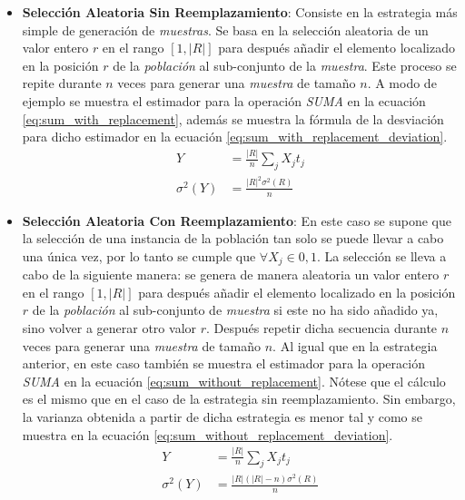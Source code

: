 \documentclass{subfiles}
\begin{document}
        \begin{itemize}

          \item \textbf{Selección Aleatoria Sin Reemplazamiento}: Consiste en la estrategia más simple de generación de \emph{muestras}. Se basa en la selección aleatoria de un valor entero $r$ en el rango $[1, |R|]$ para después añadir el elemento localizado en la posición $r$ de la \emph{población} al sub-conjunto de la \emph{muestra}. Este proceso se repite durante $n$ veces para generar una \emph{muestra} de tamaño $n$. A modo de ejemplo se muestra el estimador para la operación \emph{SUMA} en la ecuación \eqref{eq:sum_with_replacement}, además se muestra la fórmula de la desviación para dicho estimador en la ecuación \eqref{eq:sum_with_replacement_deviation}.
            \begin{align}
            \label{eq:sum_with_replacement}
              Y &= \frac{|R|}{n}\sum_jX_jt_j \\
            \label{eq:sum_with_replacement_deviation}
              \sigma^2(Y) &= \frac{|R|^2\sigma^2(R)}{n}
            \end{align}

          \item \textbf{Selección Aleatoria Con Reemplazamiento}: En este caso se supone que la selección de una instancia de la población tan solo se puede llevar a cabo una única vez, por lo tanto se cumple que $\forall X_j \in {0,1}$. La selección se lleva a cabo de la siguiente manera: se genera de manera aleatoria un valor entero $r$ en el rango $[1, |R|]$ para después añadir el elemento localizado en la posición $r$ de la \emph{población} al sub-conjunto de \emph{muestra} si este no ha sido añadido ya, sino volver a generar otro valor $r$. Después repetir dicha secuencia durante $n$ veces para generar una \emph{muestra} de tamaño $n$. Al igual que en la estrategia anterior, en este caso también se muestra el estimador para la operación \emph{SUMA} en la ecuación \eqref{eq:sum_without_replacement}. Nótese que el cálculo es el mismo que en el caso de la estrategia sin reemplazamiento. Sin embargo, la varianza obtenida a partir de dicha estrategia es menor tal y como se muestra en la ecuación \eqref{eq:sum_without_replacement_deviation}.
            \begin{align}
            \label{eq:sum_without_replacement}
              Y &= \frac{|R|}{n}\sum_jX_jt_j \\
            \label{eq:sum_without_replacement_deviation}
              \sigma^2(Y) &= \frac{|R|(|R| - n)\sigma^2(R)}{n}
            \end{align}


\end{itemize}
\end{document}
